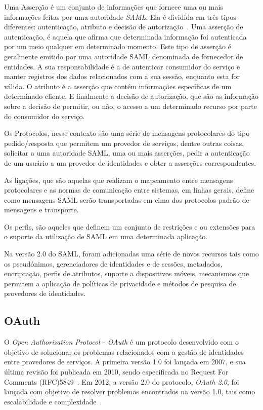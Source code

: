 Uma Asserção é um conjunto de informações que fornece uma ou mais informações feitas por uma autoridade \emph{SAML}. Ela é dividida em três tipos diferentes:  autenticação, atributo e decisão de autorização~\cite{Madsen2005,Nordbotten09,Bertino2010}. Uma asserção de autenticação, é aquela que afirma que determinada informação foi autenticada por um meio qualquer em determinado momento. Este tipo de asserção é geralmente emitido por uma autoridade SAML denominada de fornecedor de entidades. A sua responsabilidade é a de autenticar consumidor do serviço e manter registros dos dados relacionados com a sua sessão, enquanto esta for válida. O atributo é a asserção que contém informações específicas de um determinado cliente. E finalmente a decisão de autorização, que são as informação sobre a decisão de permitir, ou não, o acesso a um determinado recurso por parte do consumidor do serviço.

Os Protocolos, nesse contexto são uma série de mensagens protocolares do tipo pedido/resposta que permitem um provedor de serviços, dentre outras coisas, solicitar a uma autoridade SAML, uma ou mais asserções, pedir a autenticação de um usuário a um provedor de identidades e obter a asserções correspondentes.

As ligações, que são aquelas que realizam o mapeamento entre mensagens protocolares e as normas de comunicação entre sistemas, em linhas gerais, define como mensagens SAML serão transportadas em cima dos protocolos padrão de mensagens e transporte.

Os perfis, são aqueles que definem um conjunto de restrições e ou extensões para o suporte da utilização de SAML em uma determinada aplicação.

Na versão 2.0 do SAML, foram adicionadas uma série de novos recursos tais como os pseudónimos, gerenciadores de identidades e de sessões, metadados, encriptação, perfis de atributos, suporte a dispositivos móveis, mecanismos que permitem a aplicação de políticas de privacidade e métodos de pesquisa de provedores de identidades.

\subsection{OAuth}

O \emph{Open Authorization Protocol - OAuth} é um protocolo desenvolvido com o objetivo de solucionar os problemas relacionados com a gestão de identidades entre provedores de serviços. A primeira versão 1.0 foi lançada em 2007, e sua última revisão foi publicada em 2010, sendo especificada no Request For Comments (RFC)5849~\cite{oauth210}. Em 2012, a versão 2.0 do protocolo, \emph{OAuth 2.0}, foi lançada com objetivo de resolver problemas encontrados na versão 1.0, tais como escalabilidade e complexidade~\cite{rfc6749}.


